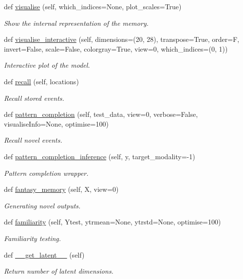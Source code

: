 \begin{DoxyCompactItemize}
def \hyperlink{group__icubclient__SAM__Core_afa85fe0230d0040053b45c92baed00c4}{visualise} (self, which\+\_\+indices=None, plot\+\_\+scales=True)
\begin{DoxyCompactList}\small\item\em Show the internal representation of the memory. \end{DoxyCompactList}\item 
def \hyperlink{group__icubclient__SAM__Core_adf56eff4d79e3253dd095bcad6ddcf14}{visualise\+\_\+interactive} (self, dimensions=(20, 28), transpose=True, order=\textquotesingle{}F\textquotesingle{}, invert=False, scale=False, colorgray=True, view=0, which\+\_\+indices=(0, 1))
\begin{DoxyCompactList}\small\item\em Interactive plot of the model. \end{DoxyCompactList}\item 
def \hyperlink{group__icubclient__SAM__Core_a2062b06580e32b119f134994ecc756d9}{recall} (self, locations)
\begin{DoxyCompactList}\small\item\em Recall stored events. \end{DoxyCompactList}\item 
def \hyperlink{group__icubclient__SAM__Core_afce62b1291617041c68233cc0e74bce6}{pattern\+\_\+completion} (self, test\+\_\+data, view=0, verbose=False, visualise\+Info=None, optimise=100)
\begin{DoxyCompactList}\small\item\em Recall novel events. \end{DoxyCompactList}\item 
def \hyperlink{group__icubclient__SAM__Core_ac7a83c12364fdedd0786cbbfa370d913}{pattern\+\_\+completion\+\_\+inference} (self, y, target\+\_\+modality=-\/1)
\begin{DoxyCompactList}\small\item\em Pattern completion wrapper. \end{DoxyCompactList}\item 
def \hyperlink{group__icubclient__SAM__Core_a8b7f765623ba4d691b54de19128f7641}{fantasy\+\_\+memory} (self, X, view=0)
\begin{DoxyCompactList}\small\item\em Generating novel outputs. \end{DoxyCompactList}\item 
def \hyperlink{group__icubclient__SAM__Core_ac5377f7dff06afcc7c9b6340dd7fdf73}{familiarity} (self, Ytest, ytrmean=None, ytrstd=None, optimise=100)
\begin{DoxyCompactList}\small\item\em Familiarity testing. \end{DoxyCompactList}\item 
def \hyperlink{group__icubclient__SAM__Core_ad55ab0d5f2e3552e0217bd86daf45ced}{\+\_\+\+\_\+get\+\_\+latent\+\_\+\+\_\+} (self)
\begin{DoxyCompactList}\small\item\em Return number of latent dimensions. \end{DoxyCompactList}\end{DoxyCompactItemize}
